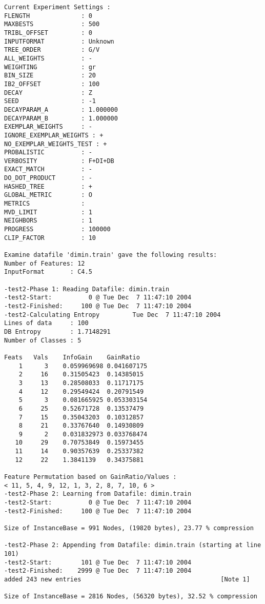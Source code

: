\begin{footnotesize}
\begin{verbatim}
Current Experiment Settings :
FLENGTH              : 0
MAXBESTS             : 500
TRIBL_OFFSET         : 0
INPUTFORMAT          : Unknown
TREE_ORDER           : G/V
ALL_WEIGHTS          : -
WEIGHTING            : gr
BIN_SIZE             : 20
IB2_OFFSET           : 100
DECAY                : Z
SEED                 : -1
DECAYPARAM_A         : 1.000000
DECAYPARAM_B         : 1.000000
EXEMPLAR_WEIGHTS     : -
IGNORE_EXEMPLAR_WEIGHTS : +
NO_EXEMPLAR_WEIGHTS_TEST : +
PROBALISTIC          : -
VERBOSITY            : F+DI+DB
EXACT_MATCH          : -
DO_DOT_PRODUCT       : -
HASHED_TREE          : +
GLOBAL_METRIC        : O
METRICS              : 
MVD_LIMIT            : 1
NEIGHBORS            : 1
PROGRESS             : 100000
CLIP_FACTOR          : 10

Examine datafile 'dimin.train' gave the following results:
Number of Features: 12
InputFormat       : C4.5

-test2-Phase 1: Reading Datafile: dimin.train
-test2-Start:          0 @ Tue Dec  7 11:47:10 2004
-test2-Finished:     100 @ Tue Dec  7 11:47:10 2004
-test2-Calculating Entropy         Tue Dec  7 11:47:10 2004
Lines of data     : 100
DB Entropy        : 1.7148291
Number of Classes : 5

Feats	Vals	InfoGain	GainRatio
    1      3	0.059969698	0.041607175
    2     16	0.31505423	0.14385015
    3     13	0.28508033	0.11717175
    4     12	0.29549424	0.20791549
    5      3	0.081665925	0.053303154
    6     25	0.52671728	0.13537479
    7     15	0.35043203	0.10312857
    8     21	0.33767640	0.14930809
    9      2	0.031832973	0.033768474
   10     29	0.70753849	0.15973455
   11     14	0.90357639	0.25337382
   12     22	1.3841139	0.34375881

Feature Permutation based on GainRatio/Values :
< 11, 5, 4, 9, 12, 1, 3, 2, 8, 7, 10, 6 >
-test2-Phase 2: Learning from Datafile: dimin.train
-test2-Start:          0 @ Tue Dec  7 11:47:10 2004
-test2-Finished:     100 @ Tue Dec  7 11:47:10 2004

Size of InstanceBase = 991 Nodes, (19820 bytes), 23.77 % compression

-test2-Phase 2: Appending from Datafile: dimin.train (starting at line 101)
-test2-Start:        101 @ Tue Dec  7 11:47:10 2004
-test2-Finished:    2999 @ Tue Dec  7 11:47:10 2004
added 243 new entries                                      [Note 1]

Size of InstanceBase = 2816 Nodes, (56320 bytes), 32.52 % compression


\end{verbatim}
\end{footnotesize}
